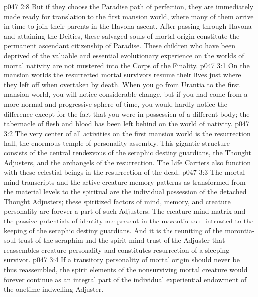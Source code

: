 \vs p047 2:8 But if they choose the Paradise path of perfection, they are immediately made ready for translation to the first mansion world, where many of them arrive in time to join their parents in the Havona ascent. After passing through Havona and attaining the Deities, these salvaged souls of mortal origin constitute the permanent ascendant citizenship of Paradise. These children who have been deprived of the valuable and essential evolutionary experience on the worlds of mortal nativity are not mustered into the Corps of the Finality.
%
\vs p047 3:1 On the mansion worlds the resurrected mortal survivors resume their lives just where they left off when overtaken by death. When you go from Urantia to the first mansion world, you will notice considerable change, but if you had come from a more normal and progressive sphere of time, you would hardly notice the difference except for the fact that you were in possession of a different body; the tabernacle of flesh and blood has been left behind on the world of nativity.
\vs p047 3:2 The very center of all activities on the first mansion world is the resurrection hall, the enormous temple of personality assembly. This gigantic structure consists of the central rendezvous of the seraphic destiny guardians, the Thought Adjusters, and the archangels of the resurrection. The Life Carriers also function with these celestial beings in the resurrection of the dead.
\vs p047 3:3 The mortal\hyp{}mind transcripts and the active creature\hyp{}memory patterns as transformed from the material levels to the spiritual are the individual possession of the detached Thought Adjusters; these spiritized factors of mind, memory, and creature personality are forever a part of such Adjusters. The creature mind\hyp{}matrix and the passive potentials of identity are present in the morontia soul intrusted to the keeping of the seraphic destiny guardians. And it is the reuniting of the morontia\hyp{}soul trust of the seraphim and the spirit\hyp{}mind trust of the Adjuster that reassembles creature personality and constitutes resurrection of a sleeping survivor.
\vs p047 3:4 If a transitory personality of mortal origin should never be thus reassembled, the spirit elements of the nonsurviving mortal creature would forever continue as an integral part of the individual experiential endowment of the onetime indwelling Adjuster.
